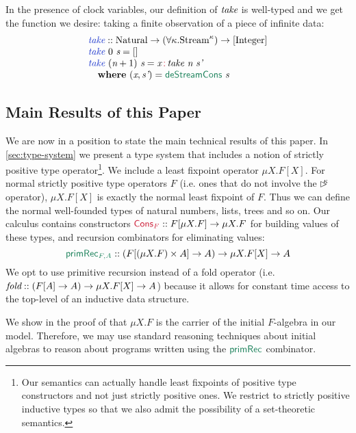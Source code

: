 In the presence of clock variables, our definition of $\textit{take}$
is well-typed and we get the function we desire: taking a finite
observation of a piece of infinite data:
\begin{displaymath}
  \begin{array}{l}
    \defn{take} :: \tyname{Natural} \to (\forall \kappa. \tyname{Stream}^\kappa) \to [\tyname{Integer}] \\
    \defn{take}\ 0\ \ident{s} = [] \\
    \defn{take}\ (\ident{n}+1)\ \ident{s} = \ident{x} \mathop{\cons{:}} \ident{take}\ \ident{n}\ \ident{s'} \\
    \quad \kw{where}\ (\ident{x}, \ident{s'}) = \elim{deStreamCons}\ \ident{s}
  \end{array}
\end{displaymath}

\subsection{Main Results of this Paper}\label{sec:main-results-intro}

We are now in a position to state the main technical results of this
paper. In \autoref{sec:type-system} we present a type system that
includes a notion of strictly positive type operator\footnote{Our
  semantics can actually handle least fixpoints of positive type
  constructors and not just strictly positive ones. We restrict to
  strictly positive inductive types so that we also admit the
  possibility of a set-theoretic semantics.}. We include a least
fixpoint operator $\mu X. F[X]$. For normal strictly positive type
operators $F$ (i.e. ones that do not involve the $\mathord{\rhd\kern-0.4em^{\kappa}}$
operator), $\mu X. F[X]$ is exactly the normal least fixpoint of
$F$. Thus we can define the normal well-founded types of natural
numbers, lists, trees and so on. Our calculus contains constructors
$\cons{Cons$_F$} :: F[\mu X. F] \to \mu X. F$ for building values of
these types, and recursion combinators for eliminating values:
\begin{displaymath}
  \elim{primRec$_{F,A}$} :: (F[(\mu X. F) \times A] \to A) \to \mu X. F[X] \to A 
\end{displaymath}
We opt to use primitive recursion instead of a fold operator
(i.e. $\textit{fold} :: (F[A] \to A) \to \mu X. F[X] \to A$) because
it allows for constant time access to the top-level of an inductive
data structure.

We show in the proof of  that $\mu X. F$
is the carrier of the initial $F$-algebra in our model. Therefore, we
may use standard reasoning techniques about initial algebras to reason
about programs written using the $\elim{primRec}$ combinator.

